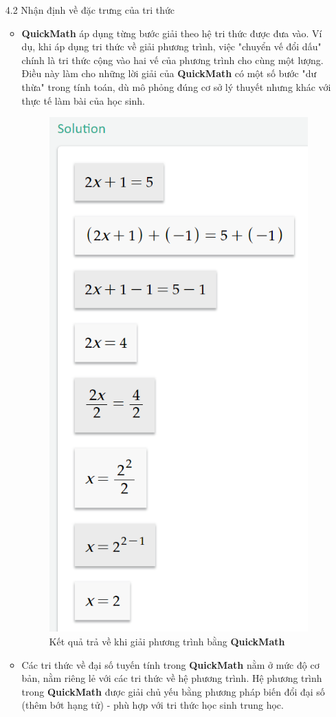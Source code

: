 \documentclass{article}
\begin{document}
\begin{enumerate}
\item [4.2]Nhận định về đặc trưng của tri thức
\begin{itemize}
\item \textbf{QuickMath} áp dụng từng bước giải theo hệ tri thức được đưa vào. Ví dụ, khi áp dụng tri thức về giải phương trình, việc "chuyển vế đổi dấu" chính là tri thức cộng vào hai vế của phương trình cho cùng một lượng. Điều này làm cho những lời giải của \textbf{QuickMath} có một số bước "dư thừa" trong tính toán, dù mô phỏng đúng cơ sở lý thuyết nhưng khác với thực tế làm bài của học sinh. 
\begin{figure}
	\centering
	\includegraphics[width=0.7\linewidth]{quickmath2}
	\caption{Kết quả trả về khi giải phương trình bằng \textbf{QuickMath}}
	\label{fig:quickmath2}
\end{figure}
\item Các tri thức về đại số tuyến tính trong \textbf{QuickMath} nằm ở mức độ cơ bản, nằm riêng lẻ với các tri thức về hệ phương trình. Hệ phương trình trong \textbf{QuickMath} được giải chủ yếu bằng phương pháp biến đổi đại số (thêm bớt hạng tử) - phù hợp với tri thức học sinh trung học.

\end{itemize}
\end{enumerate}
\end{document}
